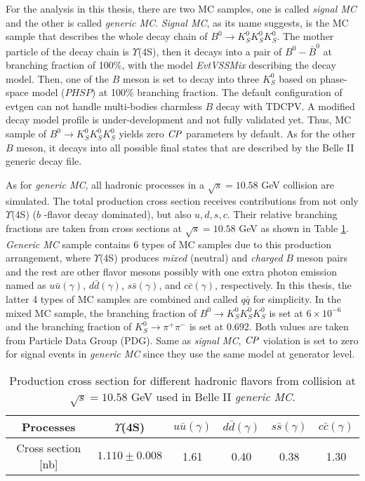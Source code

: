  For the analysis in this thesis, there are two MC samples, one is called \textit{signal MC} and the other is called \textit{generic MC}. \textit{Signal MC}, as its name suggests, is the MC sample that describes the whole decay chain of $B^0 \to K_S^0  K_S^0  K_S^0$. The mother particle of the decay chain is $\Upsilon$(4S), then it decays into a pair of $B^0-\bar{B}^0$ at branching fraction of 100\%, with the model \textit{EvtVSSMix}\cite{evtgen} describing the decay model. Then, one of the $B$ meson is set to decay into three $K_S^0$ based on phase-space model ($PHSP$) at 100\% branching fraction. The default configuration of evtgen can not handle multi-bodies charmless $B$ decay with TDCPV. A modified decay model profile is under-development and not fully validated yet. Thus, MC sample of $B^0 \to K_S^0  K_S^0  K_S^0$ yields zero $\it{CP}$ parameters by default. As for the other $B$ meson, it decays into all possible final states that are described by the Belle II generic decay file. 
 
 As for \textit{generic MC}, all hadronic processes in a  $\sqrt{s} = 10.58 $ GeV collision are simulated. The total production cross section receives contributions from not only $\Upsilon$(4S) ($b$ -flavor decay dominated), but also $u, d, s, c$. 
 Their relative branching fractions are taken from cross sections at  $\sqrt{s} = 10.58 $ GeV as shown in Table \ref{tab:generic_br}. \textit{Generic MC} sample contains 6 types of MC samples due to this production arrangement, where $\Upsilon$(4S) produces \textit{mixed} (neutral) and \textit{charged} $B$ meson pairs and the rest are other flavor mesons possibly with one extra photon emission named as $u\bar{u}(\gamma)$, $d\bar{d}(\gamma)$, $s\bar{s}(\gamma)$, and $c\bar{c}(\gamma)$, respectively. In this thesis, the latter 4 types of MC samples are combined and called $q\bar{q}$ for simplicity. In the mixed MC sample, the branching fraction of $B^0 \to K_S^0  K_S^0  K_S^0$ is set at $6 \times 10^{-6}$ and the branching fraction of $K_S^0 \to \pi^{+}\pi^{-}$ is set at 0.692. Both values are taken from Particle Data Group (PDG)\cite{pdg}. Same as \textit{signal MC}, $\it{CP}$ violation is set to zero for signal events in \textit{generic MC} since they use the same model at generator level.
 
 \begin{table}
 	\caption{Production cross section for different hadronic flavors from collision at  $\sqrt{s} = 10.58 $ GeV used in Belle II \textit{generic MC}\cite{b2book}.}
 	\label{tab:generic_br}
 	\centering
 	\begin{tabular}{c|c|c|c|c|c}
 		\hline 
 	Processes & $\Upsilon$(4S) & $u\bar{u}(\gamma)$ & $d\bar{d}(\gamma)$ & $s\bar{s}(\gamma)$ & $c\bar{c}(\gamma)$ \\
 		\hline 
 	Cross section [nb] & $1.110\pm0.008$ & 1.61 & 0.40 & 0.38 & 1.30 \\
 	\hline
 	\end{tabular}
 \end{table}
 
